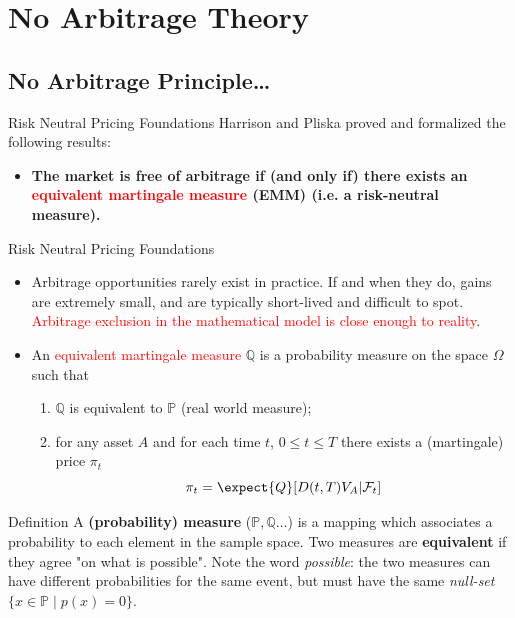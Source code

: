 \documentclass{beamer}
\begin{document}
\section{No Arbitrage Theory}
\subsection{No Arbitrage Principle\ldots}

\begin{frame}{Risk Neutral Pricing Foundations}
	Harrison and Pliska proved and formalized the following results:
	\begin{itemize}
		\item \textbf{The market is free of arbitrage if (and only if) there exists an \textcolor{red}{equivalent martingale measure} (EMM) (i.e. a risk-neutral measure).}
	\end{itemize}
	\vfill
\end{frame}

\begin{frame}{Risk Neutral Pricing Foundations}
	\begin{itemize}
		\item Arbitrage opportunities rarely exist in practice. If and when they do, gains are extremely small, and are typically short-lived and difficult to spot. \textcolor{red}{Arbitrage exclusion in the mathematical model is close enough to reality}.
		\item An \textcolor{red}{equivalent martingale measure} $\mathbb{Q}$ is a probability measure on the space $\Omega$ such that
		\begin{enumerate}
			\item $\mathbb{Q}$ is equivalent to $\mathbb{P}$ (real world measure);
			\item for any asset $A$ and for each time $t$, $0\le t\le T$ there exists a (martingale) price $\pi_t$
			\begin{equation*}
				\pi_t = \expect{Q}[D(t,T)V_A|\mathcal{F}_t]
			\end{equation*}
		\end{enumerate}
	\end{itemize}
    \begin{block}{Definition}
    A \textbf{(probability) measure} ($\mathbb{P}, \mathbb{Q}\ldots$) is a mapping which associates a probability to each element in the sample space. Two measures are \textbf{equivalent} if they agree "on what is possible". Note the word \emph{possible}: the two measures can have different probabilities for the same event, but must have the same \emph{null-set} $\{x\in {\mathbb{P}}\mid p (x)=0\}$.
    \end{block}
\end{frame}
\end{document}
